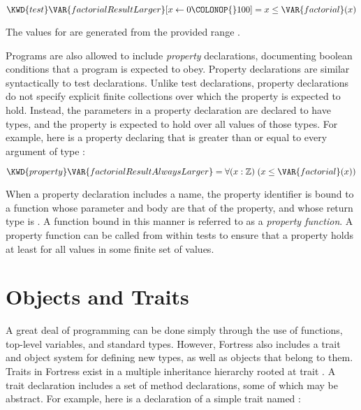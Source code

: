 \begin{Fortress}
\(\KWD{test} \VAR{factorialResultLarger} [x \leftarrow 0\COLONOP{}100] = x \leq \VAR{factorial}(x)\)
\end{Fortress}

The values for  are generated from the provided range
.

Programs are also allowed to include \emph{property} declarations, documenting boolean conditions that a program is
expected to obey. Property declarations are similar syntactically to test declarations. Unlike test declarations,
property declarations do not specify explicit finite collections over which the property is expected to hold.
Instead, the parameters in a property declaration are declared to have types, and the property is expected to hold
over all values of those types. For example, here is a property declaring that  is greater than or equal
to every argument of type :

\begin{Fortress}
\(\KWD{property} \VAR{factorialResultAlwaysLarger} = \forall (x \mathrel{\mathtt{:}} \mathbb{Z})\; (x \leq \VAR{factorial}(x))\)
\end{Fortress}

When a property declaration includes a name, the property identifier is bound to a function whose parameter and body are that of the property,
and whose return type is .
A function bound in this manner is referred to as a \emph{property function}.
A property function can be called from within tests to ensure that a
property holds at least for all values in some finite set of values.

\section{Objects and Traits}

A great deal of programming can be done simply through the use of
functions, top-level
variables, and standard types. However, Fortress also includes a trait and object system for
defining new types, as well as objects that belong to them. Traits in Fortress exist in
a multiple inheritance hierarchy rooted at trait .
A trait declaration includes a set of method declarations,
some of which may be abstract.
For example, here is a declaration of a simple trait named :

